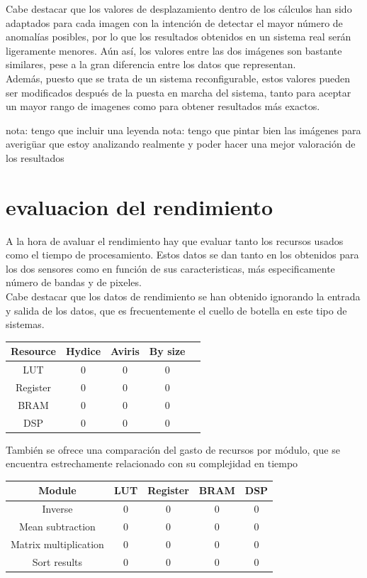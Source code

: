 Cabe destacar que los valores de desplazamiento dentro de los cálculos han sido adaptados para cada imagen con la intención de detectar el mayor número de anomalías posibles, por lo que los resultados obtenidos en un sistema real serán ligeramente menores. Aún así, los valores entre las dos imágenes son bastante similares, pese a la gran diferencia entre los datos que representan.
\\
Además, puesto que se trata de un sistema reconfigurable, estos valores pueden ser modificados después de la puesta en marcha del sistema, tanto para aceptar un mayor rango de imagenes como para obtener resultados más exactos.

nota: tengo que incluir una leyenda
nota: tengo que pintar bien las imágenes para averigüar que estoy analizando realmente y poder hacer una mejor valoración de los resultados

\section{evaluacion del rendimiento}
A la hora de avaluar el rendimiento hay que evaluar tanto los recursos usados como el tiempo de procesamiento. Estos datos se dan tanto en los obtenidos para los dos sensores como en función de sus caracteristicas, más especificamente número de bandas y de pixeles.
\\
Cabe destacar que los datos de rendimiento se han obtenido ignorando la entrada y salida de los datos, que es frecuentemente el cuello de botella en este tipo de sistemas.
\\
\begin{center}
 \begin{tabular}{|c|c|c|c|c|} 
 \hline
 Resource & Hydice & Aviris & By size \\ [0.5ex] 
 \hline\hline
 LUT & 0 & 0 & 0\\ 
 \hline
 Register & 0 & 0 & 0\\ 
 \hline
 BRAM & 0 & 0 & 0\\ 
 \hline
 DSP & 0 & 0 & 0\\ 
 \hline
\end{tabular}
\end{center}

También se ofrece una comparación del gasto de recursos por módulo, que se encuentra estrechamente relacionado con su complejidad en tiempo

\begin{center}
 \begin{tabular}{|c|c|c|c|c|} 
 \hline
 Module & LUT & Register & BRAM & DSP \\ [0.5ex] 
 \hline\hline
 Inverse & 0 & 0 & 0 & 0\\ 
 \hline
 Mean subtraction & 0 & 0 & 0 & 0\\ 
 \hline
 Matrix multiplication & 0 & 0 & 0 & 0\\ 
 \hline
 Sort results & 0 & 0 & 0 & 0\\ 
 \hline
\end{tabular}
\end{center}

